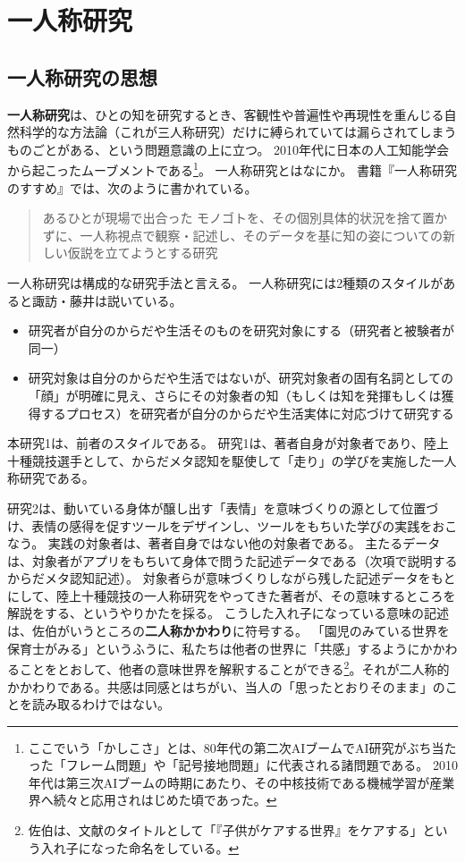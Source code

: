 \section{一人称研究}
\label{sec:ichininshokenkyu}
\subsection{一人称研究の思想}
\textbf{一人称研究}は、ひとの知を研究するとき、客観性や普遍性や再現性を重んじる自然科学的な方法論（これが三人称研究）だけに縛られていては漏らされてしまうものごとがある、という問題意識の上に立つ。
2010年代に日本の人工知能学会から起こったムーブメントである\footnote{
ここでいう「かしこさ」とは、80年代の第二次AIブームでAI研究がぶち当たった「フレーム問題」や「記号接地問題」に代表される諸問題である。
2010年代は第三次AIブームの時期にあたり、その中核技術である機械学習が産業界へ続々と応用されはじめた頃であった。
}。
一人称研究とはなにか。
書籍『一人称研究のすすめ』\cite{suwa_hori:2015}では、次のように書かれている。
\begin{quote}
  あるひとが現場で出合った モノゴトを、その個別具体的状況を捨て置かずに、一人称視点で観察・記述し、そのデータを基に知の姿についての新しい仮説を立てようとする研究
\end{quote}
一人称研究は構成的な研究手法と言える。
一人称研究には2種類のスタイルがあると諏訪・藤井\cite{suwa_fujii:2015}は説いている。
\begin{itemize}
  \item 研究者が自分のからだや生活そのものを研究対象にする（研究者と被験者が同一）
  \item 研究対象は自分のからだや生活ではないが、研究対象者の固有名詞としての「顔」が明確に見え、さらにその対象者の知（もしくは知を発揮もしくは獲得するプロセス）を研究者が自分のからだや生活実体に対応づけて研究する
\end{itemize}
本研究1は、前者のスタイルである。
研究1は、著者自身が対象者であり、陸上十種競技選手として、からだメタ認知を駆使して「走り」の学びを実施した一人称研究である。


研究2は、動いている身体が醸し出す「表情」\cite{hiromatsu:1989}を意味づくりの源として位置づけ、表情の感得を促すツールをデザインし、ツールをもちいた学びの実践をおこなう。
実践の対象者は、著者自身ではない他の対象者である。
主たるデータは、対象者がアプリをもちいて身体で問うた記述データである（次項で説明するからだメタ認知記述）。
対象者らが意味づくりしながら残した記述データをもとにして、陸上十種競技の一人称研究をやってきた著者が、その意味するところを解説をする、というやりかたを採る。
こうした入れ子になっている意味の記述は、佐伯がいうところの\textbf{二人称かかわり}\cite{saeki:2017}に符号する。
「園児のみている世界を保育士がみる」というふうに、私たちは他者の世界に「共感」するようにかかわることをとおして、他者の意味世界を解釈することができる\footnote{
  佐伯は、文献\cite{saeki:2017}のタイトルとして「『子供がケアする世界』をケアする」という入れ子になった命名をしている。
}。それが二人称的かかわりである。共感は同感とはちがい、当人の「思ったとおりそのまま」のことを読み取るわけではない。

